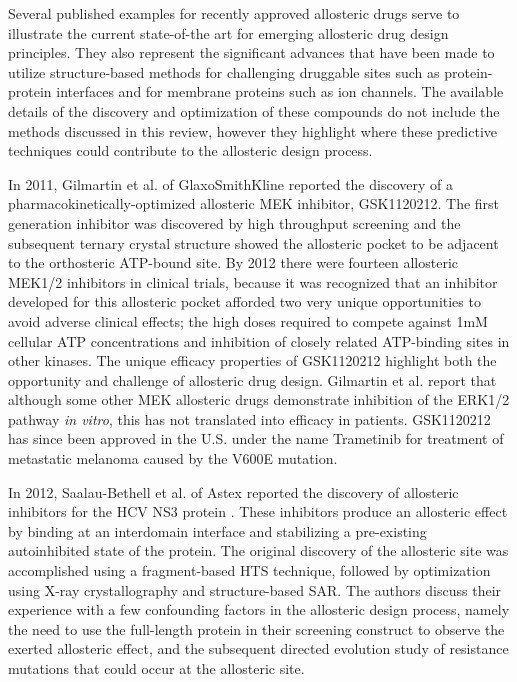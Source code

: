 \par Several published examples for recently approved allosteric drugs serve to illustrate the current state-of-the art for emerging allosteric drug design principles.  They also represent the significant advances that have been made to utilize structure-based methods for challenging druggable sites such as protein-protein interfaces and for membrane proteins such as ion channels. The available details of the discovery and optimization of these compounds do not include the methods discussed in this review, however they highlight where these predictive techniques could contribute to the allosteric design process.
\par In 2011, Gilmartin et al. of GlaxoSmithKline reported the discovery of a pharmacokinetically-optimized allosteric MEK inhibitor, GSK1120212.\cite{Gilmartin2011} The first generation inhibitor was discovered by high throughput screening \cite{Sebolt-Leopold1999} and the subsequent ternary crystal structure showed the allosteric pocket to be adjacent to the orthosteric ATP-bound site.\cite{Ohren2004} By 2012 there were fourteen allosteric MEK1/2 inhibitors in clinical trials,\cite{Zhao2014} because it was recognized that an inhibitor developed for this allosteric pocket afforded two very unique opportunities to avoid adverse clinical effects; the high doses required to compete against 1mM cellular ATP concentrations and inhibition of closely related ATP-binding sites in other kinases. The unique efficacy properties of GSK1120212 highlight both the opportunity and challenge of allosteric drug design.  Gilmartin et al. report that although some other MEK allosteric drugs demonstrate inhibition of the ERK1/2 pathway \textit{in vitro}, this has not translated into efficacy in patients.\cite{Gilmartin2011} GSK1120212  has since been approved in the U.S. under the name Trametinib for treatment of metastatic melanoma caused by the V600E mutation.
\par In 2012, Saalau-Bethell et al. of Astex reported the discovery of allosteric inhibitors for the HCV NS3 protein \cite{Saalau-bethell2012}. These inhibitors produce an allosteric effect by binding at an interdomain interface and stabilizing a pre-existing autoinhibited state of the protein. The original discovery of the allosteric site was accomplished using a fragment-based HTS technique, followed by optimization using X-ray crystallography and structure-based SAR. The authors discuss their experience with a few confounding factors in the allosteric design process, namely the need to use the full-length protein in their screening construct to observe the exerted allosteric effect, and the subsequent directed evolution study of resistance mutations that could occur at the allosteric site.
